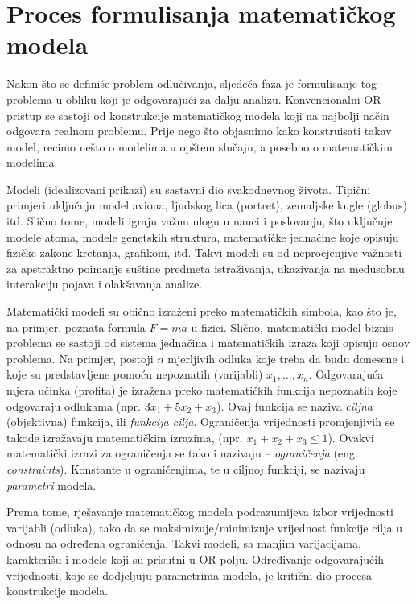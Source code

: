 \documentclass[a4paper, utf8, 11pt, colorlinks]{book}
\begin{document}
\section{Proces formulisanja matematičkog modela}

Nakon što se definiše problem odlučivanja, sljedeća faza je formulisanje tog problema u obliku koji je odgovarajući za dalju analizu. Konvencionalni OR pristup se sastoji od konstrukcije matematičkog modela koji na najbolji način odgovara realnom problemu. Prije nego što objasnimo kako konstruisati takav model, recimo nešto o modelima u opštem slučaju, a posebno o matematičkim modelima.

Modeli (idealizovani prikazi) su sastavni dio svakodnevnog života. Tipični 
primjeri uključuju model aviona, ljudskog lica (portret), zemaljske kugle (globus) itd. Slično tome, modeli igraju
važnu ulogu u nauci i poslovanju, što uključuje modele atoma, modele 
genetskih struktura, matematičke jednačine koje opisuju fizičke zakone kretanja, grafikoni, itd. Takvi modeli
su od neprocjenjive važnosti za apstraktno poimanje suštine predmeta istraživanja, ukazivanja na međusobnu interakciju pojava i olakšavanja analize. 

Matematički modeli su obično izraženi preko matematičkih simbola, kao što je, na primjer, poznata formula $F=ma$ u fizici. Slično, matematički model biznis problema   
se sastoji od sistema jednačina i matematičkih izraza koji opisuju osnov problema. Na primjer, postoji $n$ mjerljivih odluka koje treba da budu donesene i koje su predstavljene pomoću nepoznatih (varijabli) $x_1,\ldots, x_n$.  Odgovarajuća mjera učinka (profita) je izražena preko matematičkih funkcija nepoznatih koje odgovaraju  odlukama (npr. $3x_1 + 5x_2 + x_3$). Ovaj funkcija se naziva \emph{ciljna} (objektivna) funkcija, ili \emph{funkcija cilja}. Ograničenja  vrijednosti promjenjivih se takođe izražavaju matematičkim izrazima, (npr. $x_1 + x_2 + x_3 \leq 1$).  Ovakvi matematički izrazi za ograničenja se tako i nazivaju -- \emph{ograničenja} (eng. \emph{constraints}). Konstante u ograničenjima, te u ciljnoj funkciji, se nazivaju \emph{parametri} modela.

Prema tome, rješavanje matematičkog modela 
podrazumijeva izbor vrijednosti varijabli (odluka), tako da se maksimizuje/minimizuje vrijednost funkcije cilja u odnosu na određena ograničenja. Takvi modeli, sa manjim varijacijama, karakterišu i modele koji su prisutni u OR polju. 
Određivanje odgovarajućih vrijednosti, koje se dodjeljuju parametrima modela, je kritični dio procesa konstrukcije modela.
\end{document}
